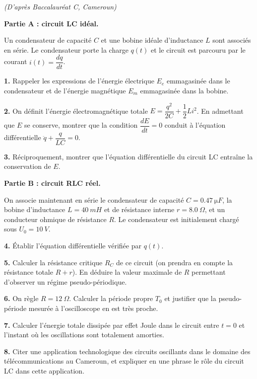\documentclass[11pt]{article}
\begin{document}
\begin{exercice}
\textit{(D'après Baccalauréat C, Cameroun)}

\textbf{Partie A : circuit LC idéal.}

Un condensateur de capacité $C$ et une bobine idéale d'inductance $L$ sont associés en série. Le condensateur porte la charge $q(t)$ et le circuit est parcouru par le courant $i(t) = \dfrac{dq}{dt}$.

\textbf{1.} Rappeler les expressions de l'énergie électrique $E_e$ emmagasinée dans le condensateur et de l'énergie magnétique $E_m$ emmagasinée dans la bobine.

\textbf{2.} On définit l'énergie électromagnétique totale $E = \dfrac{q^2}{2C} + \dfrac{1}{2}Li^2$. En admettant que $E$ se conserve, montrer que la condition $\dfrac{dE}{dt} = 0$ conduit à l'équation différentielle $\ddot{q} + \dfrac{q}{LC} = 0$.

\textbf{3.} Réciproquement, montrer que l'équation différentielle du circuit LC entraîne la conservation de $E$.

\textbf{Partie B : circuit RLC réel.}

On associe maintenant en série le condensateur de capacité $C = \SI{0,47}{\micro F}$, la bobine d'inductance $L = \SI{40}{mH}$ et de résistance interne $r = \SI{8,0}{\Omega}$, et un conducteur ohmique de résistance $R$. Le condensateur est initialement chargé sous $U_0 = \SI{10}{V}$.

\textbf{4.} Établir l'équation différentielle vérifiée par $q(t)$.

\textbf{5.} Calculer la résistance critique $R_C$ de ce circuit (on prendra en compte la résistance totale $R + r$). En déduire la valeur maximale de $R$ permettant d'observer un régime pseudo-périodique.

\textbf{6.} On règle $R = \SI{12}{\Omega}$. Calculer la période propre $T_0$ et justifier que la pseudo-période mesurée à l'oscilloscope en est très proche.

\textbf{7.} Calculer l'énergie totale dissipée par effet Joule dans le circuit entre $t = 0$ et l'instant où les oscillations sont totalement amorties.

\textbf{8.} Citer une application technologique des circuits oscillants dans le domaine des télécommunications au Cameroun, et expliquer en une phrase le rôle du circuit LC dans cette application.
\end{exercice}
\end{document}
